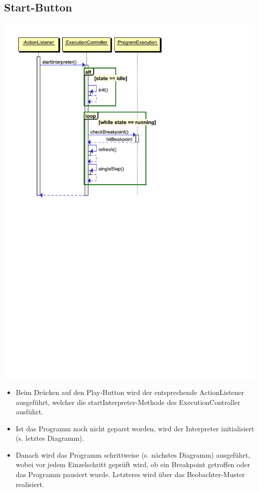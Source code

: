 \documentclass[10pt,a4paper,titlepage]{article}
\begin{document}
\subsection{Start-Button}
\includegraphics[scale=0.9]{images/Button_play.pdf} \newline
\begin{itemize}
\item Beim Drücken auf den Play-Button wird der entsprechende ActionListener ausgeführt, welcher die startInterpreter-Methode des ExecutionController ausführt.
\item Ist das Programm noch nicht geparst worden, wird der Interpreter initialisiert (s. letztes Diagramm).
\item Danach wird das Programm schrittweise (s. nächstes Diagramm) ausgeführt, wobei vor jedem Einzelschritt geprüft wird, ob ein Breakpoint getroffen oder das Programm pausiert wurde. Letzteres wird über das Beobachter-Muster realisiert.
\end{itemize}
\end{document}
